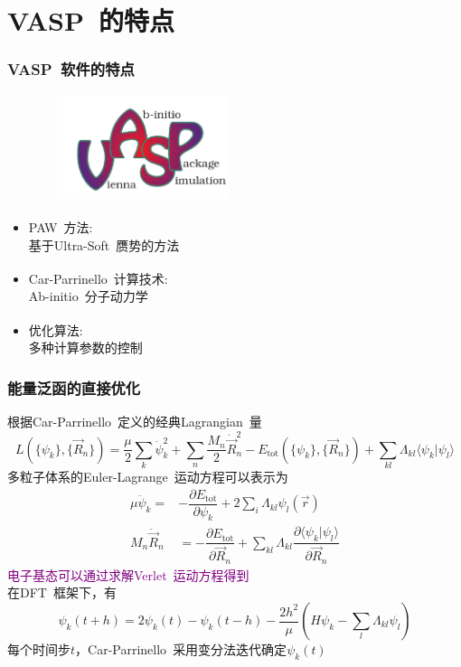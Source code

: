 \documentclass[cjk,slidestop,compress,mathserif,blue]{beamer}
\newcommand{\upcite}[1]{\hspace{0ex}\textsuperscript{\cite{#1}}} %
\begin{document}
\section{\rm{VASP}~的特点}
\frame
{
	\frametitle{\rm{VASP}~软件的特点}
\begin{figure}[h!]
	\vspace{-0.2in}
\centering
\includegraphics[height=1.2in,width=2.3in,viewport=70 0 800 420,clip]{Figures/Logo_VASP.png}
\label{VASP_logo}
\end{figure} 
\begin{itemize}
	\item \textrm{PAW}~方法\upcite{PRB59-1758_1999}:\\
		基于\textrm{Ultra-Soft}~赝势的方法
	\item \textrm{Car-Parrinello~}计算技术\upcite{Comp_Phys}:\\
		\textrm{Ab-initio}~分子动力学
	\item 优化算法\upcite{CMS6-15_1996,PRB54-11169_1996}:\\
		多种计算参数的控制
\end{itemize}
}

\frame
{
	\frametitle{能量泛函的直接优化}
	根据\textrm{Car-Parrinello~}定义的经典\textrm{Lagrangian~}量
	{\fontsize{9.0pt}{5.2pt}\selectfont
	\begin{displaymath}
		L(\{\psi_k\},\{\vec R_n\})=\frac{\mu}2\sum_k\dot{\psi}_k^2+\sum_n\frac{M_n}2\dot{\vec R}_n^2-E_{\mathrm{tot}}(\{\psi_k\},\{\vec R_n\})+\sum_{kl}\Lambda_{kl}\langle\psi_k|\psi_l\rangle
	\end{displaymath}}
	多粒子体系的\textrm{Euler-Lagrange~}运动方程可以表示为
	\begin{displaymath}
		\begin{aligned}
			\mu\ddot{\psi}_k=&-\dfrac{\partial E_{\mathrm{tot}}}{\partial\psi_k}+2\sum_i\Lambda_{kl}\psi_l(\vec r)\\
			M_n\ddot{\vec R}_n&=-\dfrac{\partial E_{\mathrm{tot}}}{\partial\vec R_n}+\sum_{kl}\Lambda_{kl}\dfrac{\partial\langle\psi_k|\psi_l\rangle}{\partial\vec R_n}
		\end{aligned}
	\end{displaymath}
	\textcolor{purple}{电子基态可以通过求解\textrm{Verlet~}运动方程得到}\\
	在\textrm{DFT~}框架下，有
	{\fontsize{9.0pt}{5.2pt}\selectfont
	\begin{displaymath}
		\psi_k(t+h)=2\psi_k(t)-\psi_k(t-h)-\dfrac{2h^2}{\mu}(H\psi_k-\sum_l\Lambda_{kl}\psi_l)
	\end{displaymath}}
	每个时间步$t$，\textrm{Car-Parrinello~}采用变分法迭代确定$\psi_k(t)$
}
\end{document}

